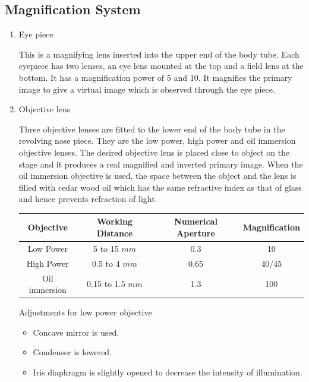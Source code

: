 \documentclass[a4paper,12pt]{book}
\begin{document}
		\subsection*{Magnification System}
		\begin{enumerate}

			\item{Eye piece
				\par This is a magnifying lens inserted into the upper end of the body tube. Each eyepiece has two lenses, an eye lens mounted at the top and a field lens at the bottom. It has a magnification power of 5 and 10. It magnifies the primary image to give a virtual image which is observed through the eye piece.}
			\item{Objective lens

				\par Three objective lenses are fitted to the lower end of the body tube in the revolving nose piece. They are the low power, high power and oil immersion objective lenses. The desired objective lens is placed close to object on the stage and it produces a real magnified and inverted primary image. When the oil immersion objective is used, the space between the object and the lens is filled with cedar wood oil which has the same refractive index as that of glass and hence prevents refraction of light.\newline
				\begin{tabular}{c | c | c | c}
					\hline
					Objective & Working Distance & Numerical Aperture &Magnification\\
					\hline
					Low Power & 5 to 15 $mm$ & 0.3 & 10\\
					\hline
					High Power
					&0.5 to 4 $mm$
					&0.65
					&40/45 \\
					\hline

					Oil immersion
					&0.15 to 1.5 $mm$
					&1.3
					&100 \\

					\hline





				\end{tabular}

				\par
				Adjustments for low power objective
				\begin{itemize}
					\item {Concave mirror is used.}
					\item {Condenser is lowered.}
					\item {Iris diaphragm is slightly opened to decrease the intensity of illumination.}
				\end{itemize}

}
\end{enumerate}
\end{document}
